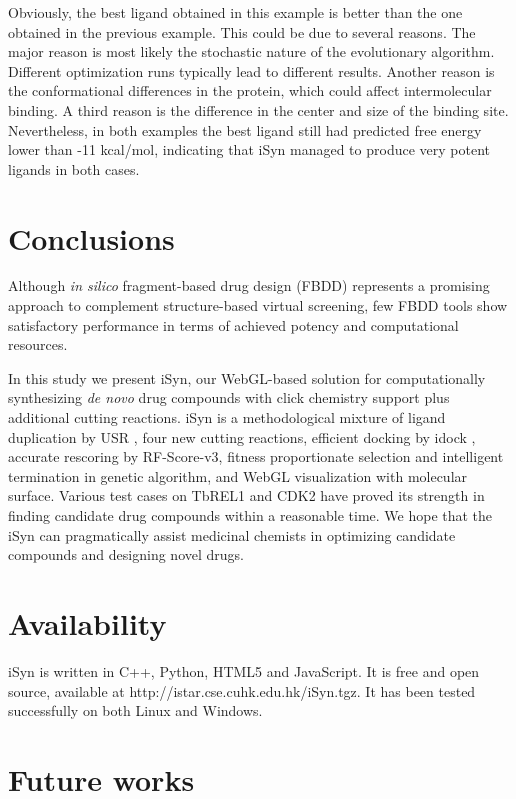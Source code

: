 Obviously, the best ligand obtained in this example is better than the one obtained in the previous example. This could be due to several reasons. The major reason is most likely the stochastic nature of the evolutionary algorithm. Different optimization runs typically lead to different results. Another reason is the conformational differences in the protein, which could affect intermolecular binding. A third reason is the difference in the center and size of the binding site. Nevertheless, in both examples the best ligand still had predicted free energy lower than -11 kcal/mol, indicating that iSyn managed to produce very potent ligands in both cases.

\section{Conclusions}

Although \textit{in silico} fragment-based drug design (FBDD) represents a promising approach to complement structure-based virtual screening, few FBDD tools show satisfactory performance in terms of achieved potency and computational resources.

In this study we present iSyn, our WebGL-based solution for computationally synthesizing \textit{de novo} drug compounds with click chemistry support plus additional cutting reactions. iSyn is a methodological mixture of ligand duplication by USR \citep{1379}, four new cutting reactions, efficient docking by idock \citep{1153}, accurate rescoring by RF-Score-v3, fitness proportionate selection and intelligent termination in genetic algorithm, and WebGL visualization with molecular surface. Various test cases on TbREL1 and CDK2 have proved its strength in finding candidate drug compounds within a reasonable time. We hope that the iSyn can pragmatically assist medicinal chemists in optimizing candidate compounds and designing novel drugs.

\section{Availability}

iSyn is written in C++, Python, HTML5 and JavaScript. It is free and open source, available at http://istar.cse.cuhk.edu.hk/iSyn.tgz. It has been tested successfully on both Linux and Windows.

\section{Future works}

